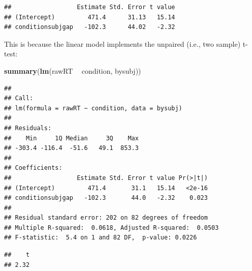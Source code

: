\documentclass[12pt,]{krantz}
\newenvironment{Shaded}{\begin{snugshade}}{\end{snugshade}}
\newcommand{\DataTypeTok}[1]{\textcolor[rgb]{0.13,0.29,0.53}{#1}}
\newcommand{\DecValTok}[1]{\textcolor[rgb]{0.00,0.00,0.81}{#1}}
\newcommand{\KeywordTok}[1]{\textcolor[rgb]{0.13,0.29,0.53}{\textbf{#1}}}
\newcommand{\NormalTok}[1]{#1}
\newcommand{\OperatorTok}[1]{\textcolor[rgb]{0.81,0.36,0.00}{\textbf{#1}}}
\newcommand{\OtherTok}[1]{\textcolor[rgb]{0.56,0.35,0.01}{#1}}
\newcommand{\StringTok}[1]{\textcolor[rgb]{0.31,0.60,0.02}{#1}}
\begin{document}
\begin{Shaded}
\end{Shaded}

\begin{verbatim}
##                  Estimate Std. Error t value
## (Intercept)         471.4      31.13   15.14
## conditionsubjgap   -102.3      44.02   -2.32
\end{verbatim}

This is because the linear model implements the unpaired (i.e., two sample) t-test:

\begin{Shaded}
\begin{Highlighting}[]
\KeywordTok{summary}\NormalTok{(}\KeywordTok{lm}\NormalTok{(rawRT }\OperatorTok{~}\StringTok{ }\NormalTok{condition, bysubj))}
\end{Highlighting}
\end{Shaded}

\begin{verbatim}
## 
## Call:
## lm(formula = rawRT ~ condition, data = bysubj)
## 
## Residuals:
##    Min     1Q Median     3Q    Max 
## -303.4 -116.4  -51.6   49.1  853.3 
## 
## Coefficients:
##                  Estimate Std. Error t value Pr(>|t|)
## (Intercept)         471.4       31.1   15.14   <2e-16
## conditionsubjgap   -102.3       44.0   -2.32    0.023
## 
## Residual standard error: 202 on 82 degrees of freedom
## Multiple R-squared:  0.0618,	Adjusted R-squared:  0.0503 
## F-statistic:  5.4 on 1 and 82 DF,  p-value: 0.0226
\end{verbatim}

\begin{Shaded}
\end{Shaded}

\begin{verbatim}
##    t 
## 2.32
\end{verbatim}
\end{document}
